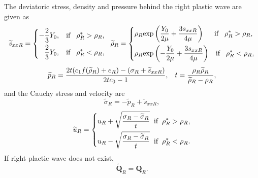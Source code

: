 \documentclass{article}
\numberwithin{equation}{section}
\numberwithin{table}{section}
\begin{document}
\begin{enumerate}
\begin{enumerate}
                           The deviatoric stress, density and pressure  behind the right plastic  wave are given as
\begin{equation*}
  \widetilde{s}_{xxR} =\left\{ \begin{aligned}
	  -\frac{2}{3}Y_0, \hspace{0.3cm} \text{if} \hspace{0.3cm} \rho_R^* > \rho_R,\\
	  \frac{2}{3}Y_0, \hspace{0.3cm} \text{if} \hspace{0.3cm} \rho_R^* < \rho_R,\\
	\end{aligned}\right.
	\hspace{0.2cm} \widetilde{\rho}_{R} = \left\{ \begin{aligned}
	  & \rho_R \text{exp}\left(\frac{Y_0}{2\mu}+\frac{3 s_{xxR}}{4\mu}\right)  \hspace{0.5cm} \text{if} \hspace{0.3cm} \rho_R^* > \rho_R,\\
& \rho_R \text{exp}\left(-\frac{Y_0}{2\mu}+\frac{3 s_{xxR}}{4\mu}\right)
\hspace{0.3cm} \text{if} \hspace{0.3cm} \rho_R^* < \rho_R,\\
  \end{aligned}\right.
 \end{equation*}
\begin{equation*}
  \widetilde{p}_R= \frac{2t(c_1f(\widetilde{\rho}_R)+e_R)-(\sigma_R+\widetilde{s}_{xxR})}{2tc_0-1}, \hspace{0.3cm}
t=\frac{\rho_R \widetilde{\rho}_R}{\widetilde{\rho}_R-\rho_R},
\end{equation*}
and the Cauchy stress and velocity are
\begin{equation*}
\widetilde{\sigma}_R = -\widetilde{p}_R+\widetilde{s}_{xxR},
\end{equation*}
\begin{equation*}
  \widetilde{u}_R= \left\{
  \begin{aligned}
	u_R+\sqrt{\frac{\sigma_R-\widetilde{\sigma}_R}{t}} \hspace{0.2cm} \text{if} \hspace{0.2cm} \rho_R^* >\rho_R,\\
	u_R-\sqrt{\frac{\sigma_R-\widetilde{\sigma}_R}{t}} \hspace{0.2cm} \text{if} \hspace{0.2cm} \rho_R^* <\rho_R.\\
\end{aligned} \right.
\end{equation*}
If right  plactic wave does not exist,
\begin{equation*}
  \widetilde{\bm{Q}}_R = \bm{Q}_R.
\end{equation*}


\end{enumerate}
\end{enumerate}
\end{document}
